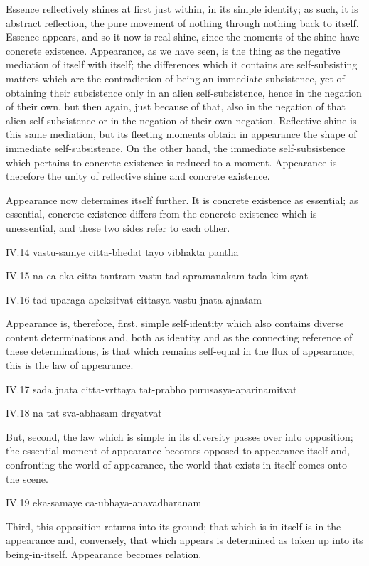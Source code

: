 Essence reflectively shines at first
just within, in its simple identity;
as such, it is abstract reflection,
the pure movement of nothing
through nothing back to itself.
Essence appears, and so it now is real shine,
since the moments of the shine have concrete existence.
Appearance, as we have seen, is the thing as
the negative mediation of itself with itself;
the differences which it contains are self-subsisting matters
which are the contradiction of being an immediate subsistence,
yet of obtaining their subsistence only in an alien self-subsistence,
hence in the negation of their own, but then again,
just because of that, also in the negation
of that alien self-subsistence
or in the negation of their own negation.
Reflective shine is this same mediation,
but its fleeting moments obtain in appearance
the shape of immediate self-subsistence.
On the other hand, the immediate self-subsistence which
pertains to concrete existence is reduced to a moment.
Appearance is therefore the unity
of reflective shine and concrete existence.

Appearance now determines itself further.
It is concrete existence as essential;
as essential, concrete existence differs
from the concrete existence which is unessential,
and these two sides refer to each other.

IV.14
vastu-samye citta-bhedat tayo vibhakta pantha

IV.15
na ca-eka-citta-tantram vastu tad apramanakam tada kim syat

IV.16
tad-uparaga-apeksitvat-cittasya vastu jnata-ajnatam

Appearance is, therefore, first, simple self-identity
which also contains diverse content determinations
and, both as identity and as the connecting reference
of these determinations,
is that which remains self-equal
in the flux of appearance;
this is the law of appearance.

IV.17
sada jnata citta-vrttaya tat-prabho purusasya-aparinamitvat

IV.18
na tat sva-abhasam drsyatvat

But, second, the law which is
simple in its diversity
passes over into opposition;
the essential moment of appearance becomes
opposed to appearance itself
and, confronting the world of appearance,
the world that exists in itself
comes onto the scene.

IV.19
eka-samaye ca-ubhaya-anavadharanam

Third, this opposition returns into its ground;
that which is in itself is in the appearance
and, conversely, that which appears is determined
as taken up into its being-in-itself.
Appearance becomes relation.


